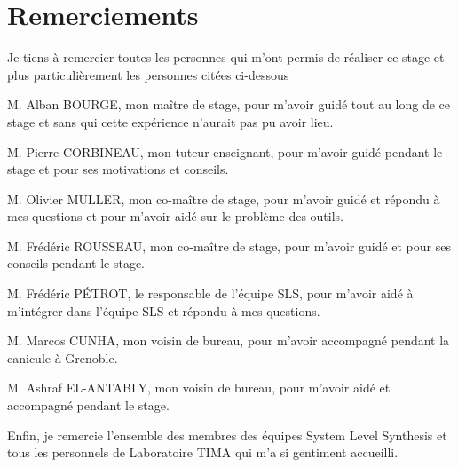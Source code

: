 \chapter*{Remerciements}
\justify
\setlength{\parindent}{0pt}
Je tiens à remercier toutes les personnes qui m'ont permis de réaliser ce stage et plus particulièrement les personnes citées ci-dessous

M. Alban BOURGE, mon maître de stage, pour m'avoir guidé tout au long de ce stage et sans qui cette expérience n'aurait pas pu avoir lieu.

M. Pierre CORBINEAU, mon tuteur enseignant, pour m'avoir guidé pendant le stage et pour ses motivations et conseils.

M. Olivier MULLER, mon co-maître de stage, pour m'avoir guidé et répondu à mes questions et pour m'avoir aidé sur le problème des outils.

M. Frédéric ROUSSEAU, mon co-maître de stage, pour m'avoir guidé et pour ses conseils pendant le stage.

M. Frédéric PÉTROT, le responsable de l'équipe SLS, pour m'avoir aidé à m'intégrer dans l'équipe SLS et répondu à mes questions.

M. Marcos CUNHA, mon voisin de bureau, pour m'avoir accompagné pendant la canicule à Grenoble.

M. Ashraf EL-ANTABLY, mon voisin de bureau, pour m'avoir aidé et accompagné pendant le stage.

Enfin, je remercie l'ensemble des membres des équipes System Level Synthesis et tous les personnels de Laboratoire TIMA qui m'a si gentiment accueilli.